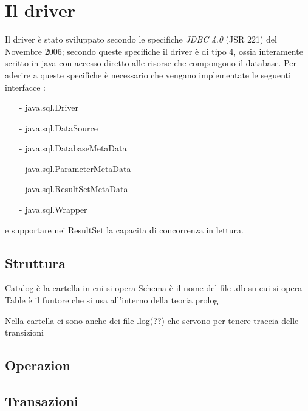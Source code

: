 \section{Il driver}

Il driver è stato sviluppato secondo le specifiche \emph{JDBC 4.0} (JSR 221) del Novembre 2006; secondo queste specifiche il driver è di tipo 4, ossia interamente scritto in java con accesso diretto alle risorse che compongono il database. Per aderire a queste specifiche è necessario che vengano implementate le seguenti interfacce : 
\begin{itemize}
\item[-] java.sql.Driver
\item[-] java.sql.DataSource
\item[-] java.sql.DatabaseMetaData
\item[-] java.sql.ParameterMetaData
\item[-] java.sql.ResultSetMetaData
\item[-] java.sql.Wrapper
\end{itemize}
e supportare nei ResultSet la capacita di concorrenza in lettura. 




 

\subsection{Struttura}

Catalog è la cartella in cui si opera
Schema è il nome del file .db su cui si opera
Table è il funtore che si usa all'interno della teoria prolog

Nella cartella ci sono anche dei file .log(??) che servono per tenere traccia delle transizioni

\subsection{Operazion}	%

\subsection{Transazioni}	%